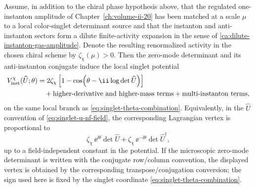 \begin{controlledapproximation}
\label{ca:instanton-determinant-chiral-spurion-potential}
Assume, in addition to the chiral phase hypothesis above, that the regulated
one-instanton amplitude of
Chapter~\ref{ch:volume-ii-20} has been matched at a scale \(\mu\)
to a local color-singlet determinant source and that the instanton and
anti-instanton sectors form a dilute finite-activity expansion in the sense of
\eqref{ca:dilute-instanton-gas-amplitude}.  Denote the resulting
renormalized activity in the chosen chiral scheme by
\(\zeta_\chi(\mu)>0\).  Then the zero-mode determinant and its
anti-instanton conjugate induce the local singlet potential
\begin{equation}
  \begin{aligned}
    V_{\rm inst}^{\chi}(\widehat U;\theta)
    &=
    2\zeta_\chi
    \left[
      1-\cos\!\left(\theta-\ii\log\det\widehat U\right)
    \right] \\
    &\quad
    +\hbox{higher-derivative and higher-mass terms}
    +\hbox{multi-instanton terms},
  \end{aligned}
  \label{eq:instanton-chiral-determinant-potential}
\end{equation}
on the same local branch as
\eqref{eq:singlet-theta-combination}.  Equivalently, in the
\(\widehat U\) convention of \eqref{eq:singlet-u-nf-field}, the corresponding
Lagrangian vertex is proportional to
\[
  \zeta_\chi\,
  \ee^{\ii\theta}\det\widehat U
  +
  \zeta_\chi\,
  \ee^{-\ii\theta}\det\widehat U^\dagger,
\]
up to a field-independent constant in the potential.  If the microscopic
zero-mode determinant is written with the conjugate row/column convention,
the displayed vertex is obtained by the corresponding transpose/conjugation
conversion; the sign used here is fixed by the singlet coordinate
\eqref{eq:singlet-theta-combination}.


\end{controlledapproximation}
